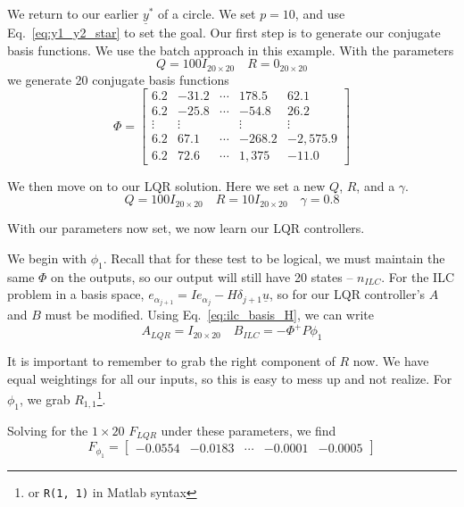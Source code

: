 We return to our earlier $\underline{y}^\ast$ of a circle. We set $p = 10$, and use Eq.~\ref{eq:y1_y2_star} to set the goal. Our first step is to generate our conjugate basis functions. We use the batch approach in this example. With the parameters
\begin{equation}
    Q = 100I_{20 \times 20}
    \quad
    R = 0_{20 \times 20}
\end{equation}
we generate 20 conjugate basis functions
\begin{equation}
    \Phi = 
    \begin{bmatrix}
        6.2 &  -31.2 & \cdots & 178.5  &  62.1\\
        6.2  & -25.8 & \cdots &-54.8  &  26.2\\
        \vdots & \vdots & & \vdots & \vdots\\
        6.2  &  67.1& \cdots & -268.2 &  -2,575.9\\
        6.2  &  72.6 & \cdots  &1,375 &  -11.0
    \end{bmatrix}
    \label{eq:circle_conj_basis}
\end{equation}

We then move on to our LQR solution. Here we set a new $Q$, $R$, and a $\gamma$. 
\begin{equation}
    Q = 100I_{20 \times 20}
    \quad
    R = 10I_{20 \times 20}
    \quad
    \gamma = 0.8
\end{equation}

With our parameters now set, we now learn our LQR controllers.

We begin with $\phi_1$. Recall that for these test to be logical, we must maintain the same $\Phi$ on the outputs, so our output will still have 20 states -- $n_{ILC}$. For the ILC problem in a basis space, $e_{\alpha_{j+1}} = Ie_{\alpha_j} - H \delta_{j+1} \underline{u}$, so for our LQR controller's $A$ and $B$ must be modified. Using Eq.~\ref{eq:ilc_basis_H}, we can write
\begin{equation}
    A_{LQR} = I_{20 \times 20}
    \quad
    B_{ILC} = -\Phi^+ P \phi_1
    \label{eq:ilc_AB_for_lqr}
\end{equation}

It is important to remember to grab the right component of $R$ now. We have equal weightings for all our inputs, so this is easy to mess up and not realize. For $\phi_1$, we grab $R_{1,1}$\footnote{or \texttt{R(1, 1)} in Matlab syntax}.

Solving for the $1 \times 20$ $F_{LQR}$ under these parameters, we find
\begin{equation}
    F_{\phi_{1}} = 
    \begin{bmatrix}
        -0.0554  & -0.0183 & \cdots &   -0.0001  & -0.0005
    \end{bmatrix}
\end{equation}


